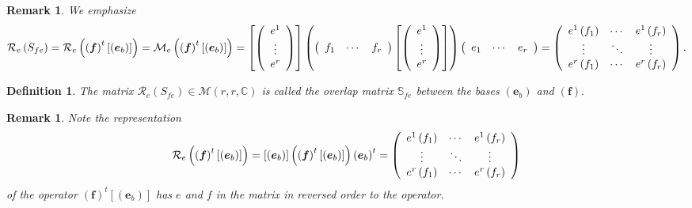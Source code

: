 \documentclass[aps,preprint]{revtex4}%
\newtheorem{definition}[theorem]{Definition}
\newtheorem{remark}[theorem]{Remark}
\begin{document}
\begin{remark}
We \emph{emphasize}
\begin{equation}
\mathcal{R}_{e}\left(  S_{fe}\right)  =\mathcal{R}_{e}\left(
\overset{}{\left(  \boldsymbol{f}\right)  ^{t}\left[  \left(  \boldsymbol{e}%
_{b}\right)  \right]  }\right)  =\mathcal{M}_{e}\left(  \overset{}{\left(
\boldsymbol{f}\right)  ^{t}\left[  \left(  \boldsymbol{e}_{b}\right)  \right]
}\right)  =\left[  \left(
\begin{array}
[c]{c}%
e^{1}\\
\vdots\\
e^{r}%
\end{array}
\right)  \right]  \left(  \left(
\begin{array}
[c]{ccc}%
f_{1} & \cdots & f_{r}%
\end{array}
\right)  \left[  \left(
\begin{array}
[c]{c}%
e^{1}\\
\vdots\\
e^{r}%
\end{array}
\right)  \right]  \right)  \left(
\begin{array}
[c]{ccc}%
e_{1} & \cdots & e_{r}%
\end{array}
\right)  =\left(
\begin{array}
[c]{ccc}%
e^{1}\left(  f_{1}\right)   & \cdots & e^{1}\left(  f_{r}\right)  \\
\vdots & \ddots & \vdots\\
e^{r}\left(  f_{1}\right)   & \cdots & e^{r}\left(  f_{r}\right)
\end{array}
\right)  .
\end{equation}

\end{remark}

\begin{definition}
The matrix $\mathcal{R}_{e}\left(  S_{fe}\right)  \in\mathcal{M}\left(
r,r,\mathbb{C}\right)  $ is called the overlap matrix $\mathbb{S}_{fe}$
between the bases $\left(  \boldsymbol{e}_{b}\right)  $ and $\left(
\boldsymbol{f}\right)  .$
\end{definition}

\begin{remark}
Note the representation
\begin{equation}
\mathcal{R}_{e}\left(  \overset{}{\left(  \boldsymbol{f}\right)  ^{t}\left[
\left(  \boldsymbol{e}_{b}\right)  \right]  }\right)  =\left[  \left(
\boldsymbol{e}_{b}\right)  \right]  \left(  \overset{}{\left(  \boldsymbol{f}%
\right)  ^{t}\left[  \left(  \boldsymbol{e}_{b}\right)  \right]  }\right)
\left(  \boldsymbol{e}_{b}\right)  ^{t}=\left(
\begin{array}
[c]{ccc}%
e^{1}\left(  f_{1}\right)  & \cdots & e^{1}\left(  f_{r}\right) \\
\vdots & \ddots & \vdots\\
e^{r}\left(  f_{1}\right)  & \cdots & e^{r}\left(  f_{r}\right)
\end{array}
\right)
\end{equation}
of the operator $\left(  \boldsymbol{f}\right)  ^{t}\left[  \left(
\boldsymbol{e}_{b}\right)  \right]  $ has $e$ and $f$ in the matrix in
reversed order to the operator.
\end{remark}
\end{document}

